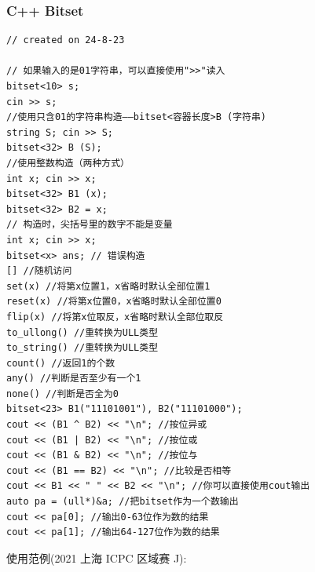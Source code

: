 \documentclass[a4paper,12pt]{article}
\begin{document}
\subsubsection{C++ Bitset}
\begin{lstlisting}
// created on 24-8-23

// 如果输入的是01字符串，可以直接使用">>"读入
bitset<10> s;
cin >> s;
//使用只含01的字符串构造——bitset<容器长度>B (字符串)
string S; cin >> S;
bitset<32> B (S);
//使用整数构造（两种方式）
int x; cin >> x;
bitset<32> B1 (x);
bitset<32> B2 = x;
// 构造时，尖括号里的数字不能是变量
int x; cin >> x;
bitset<x> ans; // 错误构造
[] //随机访问
set(x) //将第x位置1，x省略时默认全部位置1
reset(x) //将第x位置0，x省略时默认全部位置0
flip(x) //将第x位取反，x省略时默认全部位取反
to_ullong() //重转换为ULL类型
to_string() //重转换为ULL类型
count() //返回1的个数
any() //判断是否至少有一个1
none() //判断是否全为0
bitset<23> B1("11101001"), B2("11101000");
cout << (B1 ^ B2) << "\n"; //按位异或
cout << (B1 | B2) << "\n"; //按位或
cout << (B1 & B2) << "\n"; //按位与
cout << (B1 == B2) << "\n"; //比较是否相等
cout << B1 << " " << B2 << "\n"; //你可以直接使用cout输出
auto pa = (ull*)&a; //把bitset作为一个数输出
cout << pa[0]; //输出0-63位作为数的结果
cout << pa[1]; //输出64-127位作为数的结果
\end{lstlisting}

\noindent 使用范例(2021 上海 ICPC 区域赛 J):
\end{document}
